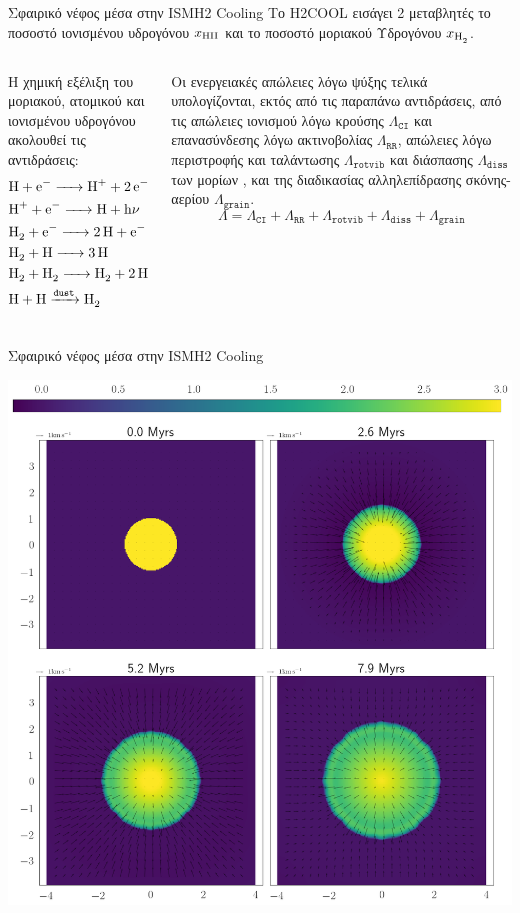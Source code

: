 \documentclass{beamer}
\begin{document}
\begin{frame}{Σφαιρικό νέφος μέσα στην ISM}{Η2 Cooling}
	Το H2COOL εισάγει 2  μεταβλητές το ποσοστό ιονισμένου υδρογόνου $x_{\ce{HII}}$ και το ποσοστό μοριακού Υδρογόνου $x_{\ce{H2}}$.
	\begin{columns}
	Η χημική εξέλιξη του μοριακού, ατομικού και ιονισμένου υδρογόνου ακολουθεί τις αντιδράσεις:
		\begin{align}
		&\ce{H + e^- -> H^+ + 2e^-} \\
		&\ce{H^+ + e^- -> H + h\nu}\\
		&\ce{H_2 + e^- -> 2H + e^-} \\
		&\ce{H_2 + H -> 3H}\\
		&\ce{H_2 + H_2 -> H_2 + 2H} \\
		&\ce{H + H ->[\mathtt{dust}] H_2}
		\end{align}
	
		Οι ενεργειακές απώλειες λόγω ψύξης τελικά υπολογίζονται, εκτός από τις παραπάνω αντιδράσεις, από τις απώλειες ιονισμού λόγω κρούσης $\Lambda _{\mathtt{CI}}$ και επανασύνδεσης λόγω ακτινοβολίας $\Lambda _{\mathtt{RR}}$, απώλειες λόγω περιστροφής και ταλάντωσης $\Lambda _{\mathtt{rotvib}}$ και διάσπασης  $\Lambda _{\mathtt{diss}}$ των μορίων , και της διαδικασίας αλληλεπίδρασης σκόνης-αερίου $\Lambda _{\mathtt{grain}}$.
		\begin{equation}
		\Lambda = \Lambda _{\mathtt{CI}} + \Lambda _{\mathtt{RR}} +\Lambda _{\mathtt{rotvib}} + \Lambda _{\mathtt{diss}} + \Lambda _{\mathtt{grain}}
		\end{equation}
	\end{columns}
\end{frame}

\begin{frame}{Σφαιρικό νέφος μέσα στην ISM}{Η2 Cooling}
			\begin{center}
				\includegraphics[width=0.6\linewidth]{../Document/DataImages/H2CoolingRHOquad}
			\end{center}

\end{frame}
\end{document}
